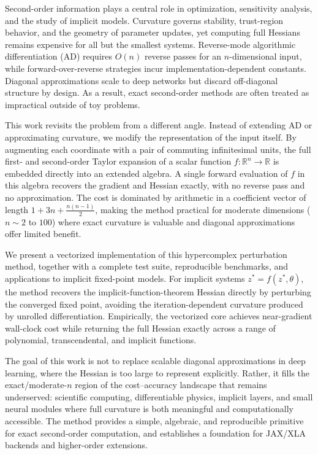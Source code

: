 Second-order information plays a central role in optimization, sensitivity analysis,
and the study of implicit models. Curvature governs stability, trust-region behavior,
and the geometry of parameter updates, yet computing full Hessians remains expensive
for all but the smallest systems. Reverse-mode algorithmic differentiation (AD)
requires $O(n)$ reverse passes for an $n$-dimensional input, while forward-over-reverse
strategies incur implementation-dependent constants. Diagonal approximations scale to
deep networks but discard off-diagonal structure by design. As a result, exact
second-order methods are often treated as impractical outside of toy problems.

This work revisits the problem from a different angle. Instead of extending AD or
approximating curvature, we modify the representation of the input itself. By
augmenting each coordinate with a pair of commuting infinitesimal units, the full
first- and second-order Taylor expansion of a scalar function $f:\mathbb{R}^n \to
\mathbb{R}$ is embedded directly into an extended algebra. A single forward evaluation
of $f$ in this algebra recovers the gradient and Hessian exactly, with no reverse pass
and no approximation. The cost is dominated by arithmetic in a coefficient vector of
length $1 + 3n + \frac{n(n-1)}{2}$, making the method practical for moderate
dimensions ($n \sim 2$ to $100$) where exact curvature is valuable and diagonal
approximations offer limited benefit.

We present a vectorized implementation of this hypercomplex perturbation method,
together with a complete test suite, reproducible benchmarks, and applications to
implicit fixed-point models. For implicit systems $z^* = f(z^*, \theta)$, the method
recovers the implicit-function-theorem Hessian directly by perturbing the converged
fixed point, avoiding the iteration-dependent curvature produced by unrolled
differentiation. Empirically, the vectorized core achieves near-gradient wall-clock
cost while returning the full Hessian exactly across a range of polynomial,
transcendental, and implicit functions.

The goal of this work is not to replace scalable diagonal approximations in deep
learning, where the Hessian is too large to represent explicitly. Rather, it fills the
exact/moderate-$n$ region of the cost--accuracy landscape that remains underserved:
scientific computing, differentiable physics, implicit layers, and small neural
modules where full curvature is both meaningful and computationally accessible. The
method provides a simple, algebraic, and reproducible primitive for exact second-order
computation, and establishes a foundation for JAX/XLA backends and higher-order
extensions.


